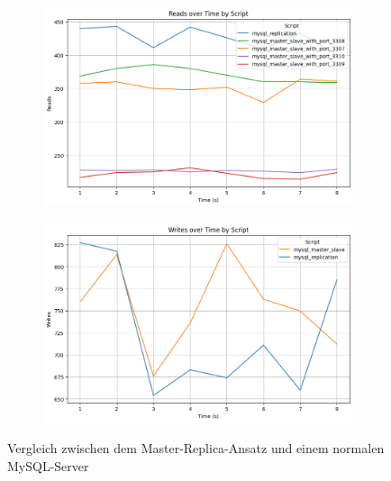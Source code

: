 \vspace{-8pt}
\begin{figure}[H]
  \centering
  \begin{subfigure}[t]{0.48\textwidth}
    \centering
    \includegraphics[width=\textwidth]{PNGs/Script/Replication/replication-vs-no/Reads}
    \label{replication-vs-no-reads}
  \end{subfigure}
  \hfill
  \begin{subfigure}[t]{0.48\textwidth}
    \centering
    \includegraphics[width=\textwidth]{PNGs/Script/Replication/replication-vs-no/Writes}
    \label{replication-vs-no-writes}
  \end{subfigure}
  \vspace{-20pt}
  \caption[Replikation: Metrikvergleich]{Vergleich zwischen dem Master-Replica-Ansatz und einem normalen MySQL-Server }
  \label{fig:replication-vs-no}
\end{figure}
\vspace{-20pt}

